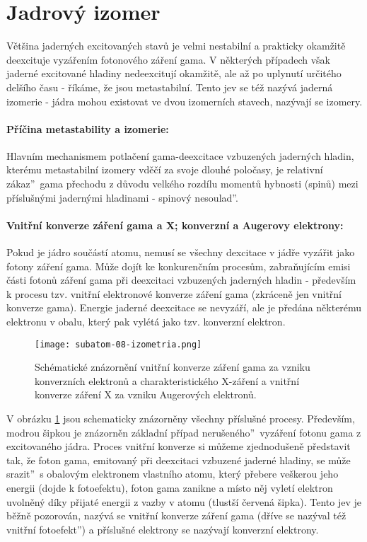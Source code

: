 \documentclass[../../main.tex]{subfiles}
\begin{document}
\section{Jadrový izomer}
Většina jaderných excitovaných stavů je velmi nestabilní a prakticky okamžitě deexcituje vyzářením fotonového záření gama. V některých případech však jaderné excitované hladiny nedeexcitují okamžitě, ale až po uplynutí určitého delšího času - říkáme, že jsou metastabilní. Tento jev se též nazývá jaderná izomerie - jádra mohou existovat ve dvou izomerních stavech, nazývají se izomery. 

\paragraph{Příčina metastability a izomerie:} 
Hlavním mechanismem potlačení gama-deexcitace vzbuzených jaderných hladin, kterému metastabilní izomery vděčí za svoje dlouhé poločasy, je relativní \quotedblbase zákaz\textquotedblright ~gama přechodu z důvodu velkého rozdílu momentů hybnosti (spinů) mezi příslušnými jadernými hladinami - \quotedblbase spinový nesoulad\textquotedblright . 

\paragraph{Vnitřní konverze záření gama a X; konverzní a Augerovy elektrony:}
Pokud je jádro součástí atomu, nemusí se všechny dexcitace v jádře vyzářit jako fotony záření gama. Může dojít ke konkurenčním procesům, zabraňujícím emisi části fotonů záření gama při deexcitaci vzbuzených jaderných hladin - především k procesu tzv. vnitřní elektronové konverze záření gama (zkráceně jen vnitřní konverze gama). Energie jaderné deexcitace se nevyzáří, ale je předána některému elektronu v obalu, který pak vylétá jako tzv. konverzní elektron.

\begin{figure}[!h]
\texttt{[image: subatom-08-izometria.png]}
\centering
\caption{Schématické znázornění vnitřní konverze záření gama za vzniku konverzních elektronů a charakteristického X-záření a vnitřní konverze záření X za vzniku Augerových elektronů.}
\label{sf8:fig:izometria}
\end{figure}

V obrázku \ref{sf8:fig:izometria} jsou schematicky znázorněny všechny příslušné procesy. Především, modrou šipkou je znázorněn základní případ \quotedblbase nerušeného\textquotedblright ~vyzáření fotonu gama z excitovaného jádra. Proces vnitřní konverze si můžeme zjednodušeně představit tak, že foton gama, emitovaný při deexcitaci vzbuzené jaderné hladiny, se může \quotedblbase srazit\textquotedblright ~s obalovým elektronem vlastního atomu, který přebere veškerou jeho energii (dojde k fotoefektu), foton gama zanikne a místo něj vyletí elektron uvolněný díky přijaté energii z vazby v atomu (tlustší červená šipka). Tento jev je běžně pozorován, nazývá se vnitřní konverze záření gama (dříve se nazýval též \quotedblbase vnitřní fotoefekt\textquotedblright ) a příslušné elektrony se nazývají konverzní elektrony.
\end{document}
